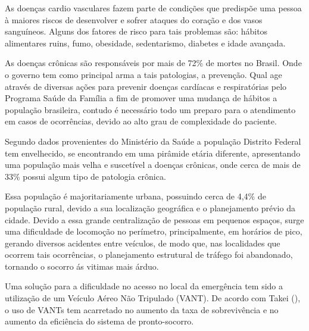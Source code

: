 As doenças cardio vasculares fazem parte de condições que predispõe uma pessoa à maiores riscos de 
desenvolver e sofrer ataques do coração e dos vasos sanguíneos. Alguns dos fatores de risco para tais problemas são: 
hábitos alimentares ruins, fumo, obesidade, sedentarismo, diabetes e idade avançada. \cite{ceolin}

As doenças crônicas são responsáveis por mais de 72\% de mortes no Brasil. Onde o governo tem como principal arma a tais patologias, 
a prevenção. Qual age através de diversas ações para prevenir doenças cardíacas e respiratórias pelo Programa Saúde da Família a fim de promover
uma mudança de hábitos a população brasileira, contudo é necessário todo um preparo para o atendimento em casos de ocorrências, devido ao alto grau de 
complexidade do paciente.

Segundo dados provenientes do Ministério da Saúde a população Distrito Federal tem envelhecido, se encontrando em uma pirâmide etária diferente, 
apresentando uma população mais velha e suscetível a doenças crônicas, onde cerca de mais de 33\% possui algum tipo de patologia crônica. \cite{portal}

Essa população é majoritariamente urbana, possuindo cerca de 4,4\% de população rural, devido a sua localização geográfica e o planejamento prévio da cidade. 
Devido a essa grande centralização de pessoas em pequenos espaços, surge uma dificuldade de locomoção no perímetro, principalmente, em horários de pico, 
gerando diversos acidentes entre veículos, de modo que, nas localidades que ocorrem tais ocorrências, o planejamento estrutural de tráfego foi abandonado, 
tornando o socorro ás vitimas mais árduo. \cite{oliveira}

Uma solução para a dificuldade no acesso no local da emergência tem sido a utilização de um Veículo Aéreo Não Tripulado (VANT). 
De acordo com Takei (\citeyear{DEE}), o uso de VANTs tem acarretado no aumento da taxa de sobrevivência e no aumento da eficiência do sistema de pronto-socorro.